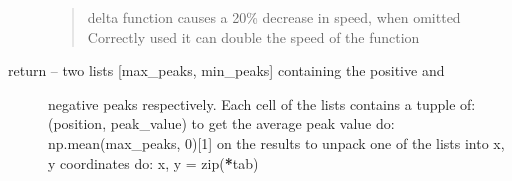 \documentclass[letterpaper,10pt,english]{sphinxmanual}
\begin{document}
\begin{fulllineitems}
\begin{description}
\begin{quote}
delta function causes a 20\% decrease in speed, when omitted
Correctly used it can double the speed of the function
\end{quote}

\item[{return -- two lists {[}max\_peaks, min\_peaks{]} containing the positive and}] \leavevmode
negative peaks respectively. Each cell of the lists contains a tupple
of: (position, peak\_value) 
to get the average peak value do: np.mean(max\_peaks, 0){[}1{]} on the
results to unpack one of the lists into x, y coordinates do: 
x, y = zip({\color{red}\bfseries{}*}tab)

\end{description}

\end{fulllineitems}

\end{document}
